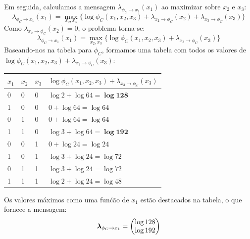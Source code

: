 \begin{exenumerate}
\begin{solution}
        Em seguida, calculamos a mensagem $\lambda_{\phi_C \to x_1}(x_1)$ ao maximizar sobre $x_2$ e $x_3$:
        \begin{equation}
            \lambda_{\phi_C \to x_1}(x_1)  = \max_{x_2, x_3} \{ \log \phi_C(x_1, x_2, x_3) + \lambda_{x_2 \to \phi_C}(x_2) + \lambda_{x_3 \to \phi_C}(x_3) \}
        \end{equation}
        Como $\lambda_{x_2 \to \phi_C}(x_2) = 0$, o problema torna-se:
        \begin{equation}
            \lambda_{\phi_C \to x_1}(x_1)  = \max_{x_2, x_3} \{ \log \phi_C(x_1, x_2, x_3) + \lambda_{x_3 \to \phi_C}(x_3) \}
        \end{equation}
        Baseando-nos na tabela para $\phi_C$, formamos uma tabela com todos
        os valores de $\log \phi_C(x_1, x_2, x_3) + \lambda_{x_3 \to \phi_C}(x_3)$:
        \begin{center}
            \begin{tabular}{llll}
                \toprule
                $x_1$ & $x_2$ & $x_3$ & $\log \phi_C(x_1, x_2, x_3) + \lambda_{x_3 \to \phi_C}(x_3)$\\
                \midrule
                0 & 0 & 0 & $\log 2 + \log 64 = \boldsymbol{\log 128}$ \\
                1 & 0 & 0 & $0 + \log 64 = \log 64$ \\
                0 & 1 & 0 & $0 + \log 64 = \log 64$ \\
                1 & 1 & 0 & $\log 3 + \log 64 = \boldsymbol{\log 192}$ \\
                0 & 0 & 1 & $0 + \log 24 = \log 24$ \\
                1 & 0 & 1 & $\log 3 + \log 24 = \log 72$ \\
                0 & 1 & 1 & $\log 3 + \log 24 = \log 72 $ \\
                1 & 1 & 1 & $\log 2 + \log 24 = \log 48$ \\
                \bottomrule
            \end{tabular}
        \end{center}
        Os valores m\'aximos como uma fun\'c\~ao de $x_1$ est\~ao destacados na tabela, o que fornece a mensagem:
        \begin{equation}
            \lambdab_{\phi_C \to x_1} = \begin{pmatrix}
                \log 128\\
                \log 192
            \end{pmatrix}

\end{equation}
\end{solution}
\end{exenumerate}
